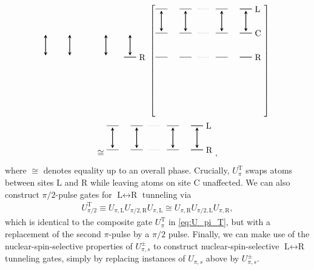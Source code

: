 \documentclass[aps,nofootinbib,notitlepage,11pt]{revtex4-1}
\renewcommand{\sp}[1]{\left[#1\right]} %
\renewcommand{\L}{\text{L}}
\newcommand{\C}{\text{C}}
\newcommand{\R}{\text{R}}
\newcommand{\T}{\text{T}}
\newcommand{\1}{\mathds{1}}
\begin{document}
\begin{multline}
{\begin{tikzpicture}[
      scale=0.5,
      trans/.style={thick,<->,shorten >=2pt,shorten <=2pt,>=stealth}
      ]
      \draw (7,-4) -- (8,-4);
      \draw (7,-4) -- (8,-4) node[right] {$\R$};
      \draw[trans] (0.5,-2) -- (0.5,-4);
      \draw[trans] (2.5,-2) -- (2.5,-4);
      \draw[trans] (5.5,-2) -- (5.5,-4);
      \draw[trans] (7.5,-2) -- (7.5,-4);
    \end{tikzpicture}}
  \sp{\begin{tikzpicture}[
      scale=0.5,
      trans/.style={thick,<->,shorten >=2pt,shorten <=2pt,>=stealth}
      ]
      \draw (0,0) -- (1,0);
      \draw (2,0) -- (3,0);
      \draw[dotted] (3.5,0) -- (4.5,0);
      \draw (5,0) -- (6,0);
      \draw (7,0) -- (8,0);
      \draw (7,0) -- (8,0) node[right] {$\L$};
      \draw (0,-2) -- (1,-2);
      \draw (2,-2) -- (3,-2);
      \draw[dotted] (3.5,-2) -- (4.5,-2);
      \draw (5,-2) -- (6,-2);
      \draw (7,-2) -- (8,-2);
      \draw (7,-2) -- (8,-2) node[right] {$\C$};
      \draw (0,-4) -- (1,-4);
      \draw (2,-4) -- (3,-4);
      \draw[dotted] (3.5,-4) -- (4.5,-4);
      \draw (5,-4) -- (6,-4);
      \draw (7,-4) -- (8,-4);
      \draw (7,-4) -- (8,-4) node[right] {$\R$};
      \draw[trans] (0.5,0) -- (0.5,-2);
      \draw[trans] (2.5,0) -- (2.5,-2);
      \draw[trans] (5.5,0) -- (5.5,-2);
      \draw[trans] (7.5,0) -- (7.5,-2);
    \end{tikzpicture}} \\
  \cong
  \begin{tikzpicture}[
    scale=0.5,
    trans/.style={thick,<->,shorten >=2pt,shorten <=2pt,>=stealth}
    ]
    \draw (0,0) -- (1,0);
    \draw (2,0) -- (3,0);
    \draw[dotted] (3.5,0) -- (4.5,0);
    \draw (5,0) -- (6,0);
    \draw (7,0) -- (8,0);
    \draw (7,0) -- (8,0) node[right] {$\L$};
    \draw (0,-2) -- (1,-2);
    \draw (2,-2) -- (3,-2);
    \draw[dotted] (3.5,-2) -- (4.5,-2);
    \draw (5,-2) -- (6,-2);
    \draw (7,-2) -- (8,-2);
    \draw (7,-2) -- (8,-2) node[right] {$\R$};
    \draw[trans] (0.5,0) -- (0.5,-2);
    \draw[trans] (2.5,0) -- (2.5,-2);
    \draw[trans] (5.5,0) -- (5.5,-2);
    \draw[trans] (7.5,0) -- (7.5,-2);
  \end{tikzpicture},
  \label{eq:U_pi_T}
\end{multline}
where $\cong$ denotes equality up to an overall phase.  Crucially,
$U_\pi^\T$ swaps atoms between sites $\L$ and $\R$ while leaving atoms
on site $\C$ unaffected.  We can also construct $\pi/2$-pulse gates
for $\L\leftrightarrow\R$ tunneling via
\begin{align}
  U_{\pi/2}^\T
  \equiv U_{\pi,\L} U_{\pi/2,\R} U_{\pi,\L}
  \cong U_{\pi,\R} U_{\pi/2,\L} U_{\pi,\R},
\end{align}
which is identical to the composite gate $U_\pi^\T$ in
\eqref{eq:U_pi_T}, but with a replacement of the second $\pi$-pulse by
a $\pi/2$ pulse.  Finally, we can make use of the
nuclear-spin-selective properties of $U_{\pi,s}^\pm$ to construct
nuclear-spin-selective $\L\leftrightarrow\R$ tunneling gates, simply
by replacing instances of $U_{\pi,s}$ above by $U_{\pi,s}^\pm$.
\end{document}
